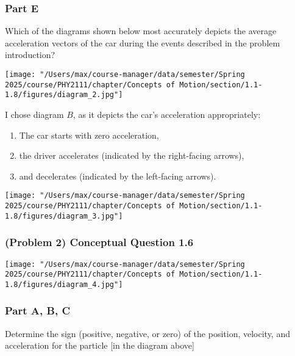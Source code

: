 \subsubsection{Part E}
Which of the diagrams shown below most accurately depicts the average acceleration vectors of the car during the events described in the problem introduction?

\begin{center}
	\texttt{[image: "/Users/max/course-manager/data/semester/Spring 2025/course/PHY2111/chapter/Concepts of Motion/section/1.1-1.8/figures/diagram\_2.jpg"]}
\end{center}

\vspace{1em}

\begin{solution}
	I chose diagram $B$, as it depicts the car's acceleration appropriately:
	\begin{enumerate}
		\item The car starts with zero acceleration,
		\item the driver accelerates (indicated by the right-facing arrows),
		\item and decelerates (indicated by the left-facing arrows).
	\end{enumerate}
\end{solution}

\begin{center}
	\texttt{[image: "/Users/max/course-manager/data/semester/Spring 2025/course/PHY2111/chapter/Concepts of Motion/section/1.1-1.8/figures/diagram\_3.jpg"]}
\end{center}

\newpage

\subsubsection{(Problem 2) Conceptual Question 1.6}

\begin{center}
	\texttt{[image: "/Users/max/course-manager/data/semester/Spring 2025/course/PHY2111/chapter/Concepts of Motion/section/1.1-1.8/figures/diagram\_4.jpg"]}
\end{center}

\subsubsection{Part A, B, C}
Determine the sign (positive, negative, or zero) of the position, velocity, and acceleration for the particle [in the diagram above]

